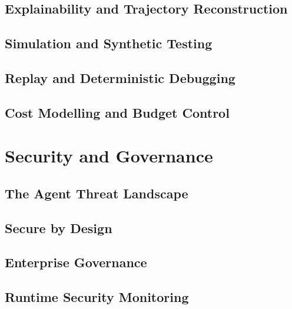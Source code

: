 \chapter{Explainability and Trajectory Reconstruction}
\label{ch:explainability}


\chapter{Simulation and Synthetic Testing}
\label{ch:simulation}


\chapter{Replay and Deterministic Debugging}
\label{ch:replay}


\chapter{Cost Modelling and Budget Control}
\label{ch:cost-modelling}



\part{Security and Governance}
\label{part:security}

\chapter{The Agent Threat Landscape}
\label{ch:threat-landscape}


\chapter{Secure by Design}
\label{ch:secure-by-design}


\chapter{Enterprise Governance}
\label{ch:enterprise-governance}


\chapter{Runtime Security Monitoring}
\label{ch:runtime-security}


